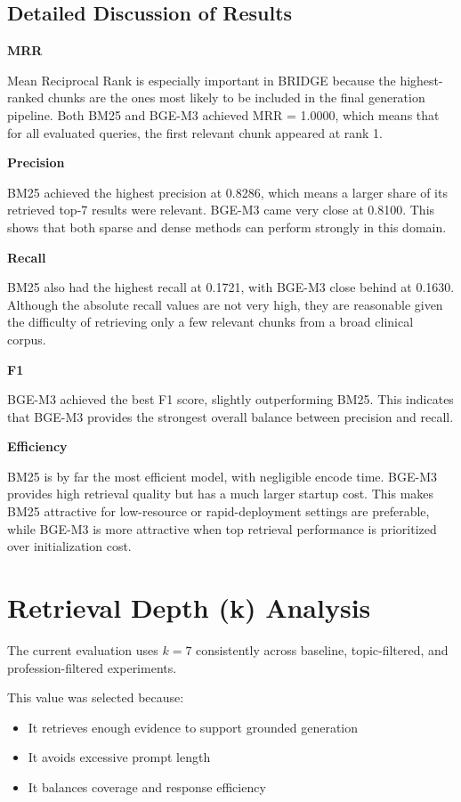 \documentclass[12pt]{article}
\begin{document}
\subsection{Detailed Discussion of Results}

\textbf{MRR}

Mean Reciprocal Rank is especially important in BRIDGE because the highest-ranked chunks are the ones most likely to be included in the final generation pipeline. Both BM25 and BGE-M3 achieved MRR = 1.0000, which means that for all evaluated queries, the first relevant chunk appeared at rank 1.

\textbf{Precision}

BM25 achieved the highest precision at 0.8286, which means a larger share of its retrieved top-7 results were relevant. BGE-M3 came very close at 0.8100. This shows that both sparse and dense methods can perform strongly in this domain.

\textbf{Recall}

BM25 also had the highest recall at 0.1721, with BGE-M3 close behind at 0.1630. Although the absolute recall values are not very high, they are reasonable given the difficulty of retrieving only a few relevant chunks from a broad clinical corpus.

\textbf{F1}

BGE-M3 achieved the best F1 score, slightly outperforming BM25. This indicates that BGE-M3 provides the strongest overall balance between precision and recall.

\textbf{Efficiency}

BM25 is by far the most efficient model, with negligible encode time. BGE-M3 provides high retrieval quality but has a much larger startup cost. This makes BM25 attractive for low-resource or rapid-deployment settings are preferable, while BGE-M3 is more attractive when top retrieval performance is prioritized over initialization cost.

\section{Retrieval Depth (k) Analysis}

The current evaluation uses $k = 7$ consistently across baseline, topic-filtered, and profession-filtered experiments.

This value was selected because:

\begin{itemize}[leftmargin=1.5em]
    \item It retrieves enough evidence to support grounded generation
    \item It avoids excessive prompt length
    \item It balances coverage and response efficiency
\end{itemize}
\end{document}
